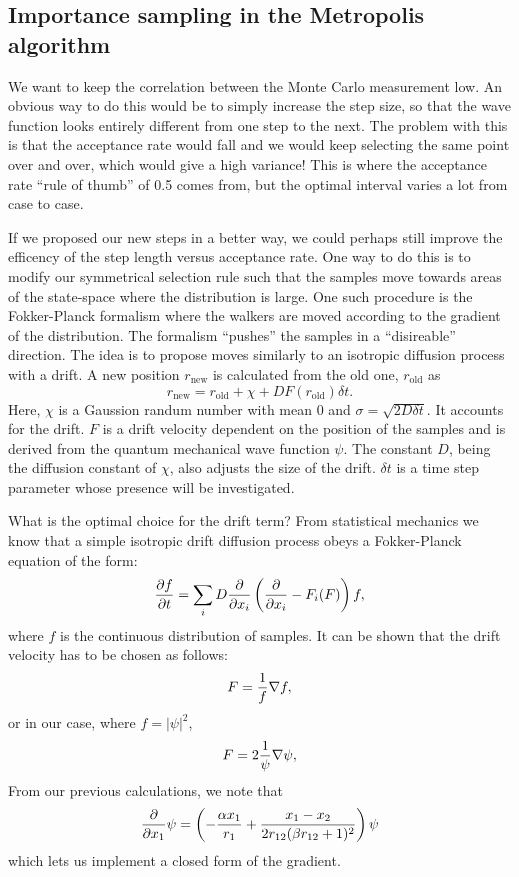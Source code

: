 \documentclass[aps,prc,twocolumn,floatfix]{revtex4}
\begin{document}
\subsection{Importance sampling in the Metropolis algorithm}
 We want to keep the correlation between the Monte Carlo measurement low. An obvious way to do this would be to simply increase the step size, so that the wave function looks entirely different from one step to the next. The problem with this is that the acceptance rate would fall and we would keep selecting the same point over and over, which would give a high variance! This is where the acceptance rate ``rule of thumb'' of 0.5 comes from, but the optimal interval varies a lot from case to case.
 
 If we proposed our new steps in a better way, we could perhaps still improve the efficency of the step length versus acceptance rate. One way to do this is to modify our symmetrical selection rule such that the samples move towards areas of the state-space where the distribution is large. One such procedure is the Fokker-Planck formalism where the walkers are moved according to the gradient of the distribution. The formalism ``pushes'' the samples in a ``disireable'' direction. The idea is to propose moves similarly to an isotropic diffusion process with a drift. A new position $r_\text{new}$ is calculated from the old one, $r_\text{old}$ as
 \begin{equation}
  r_\text{new} = r_\text{old} + \chi + DF(r_\text{old}) \delta t.
 \end{equation}
Here, $\chi$ is a Gaussion randum number with mean 0 and $\sigma = \sqrt{2D\delta t}$. It accounts for the drift. $F$ is a drift velocity dependent on the position of the samples and is derived from the quantum mechanical wave function $\psi$. The constant $D$, being the diffusion constant of $\chi$, also adjusts the size of the drift. $\delta t$ is a time step parameter whose presence will be investigated. 

What is the optimal choice for the drift term? From statistical mechanics we know that a simple isotropic drift diffusion process obeys a Fokker-Planck equation of the form:
\begin{equation}
 {\partial f \over \partial t} = \sum_i D {\partial \over \partial x_i} \left( {\partial \over \partial x_i} - F_i(F)\right) f,
\end{equation}
where $f$ is the continuous distribution of samples. It can be shown that the drift velocity has to be chosen as follows: 
\begin{equation}
 F = {1 \over f} \nabla f,
\end{equation}
or in our case, where $f = |\psi|^2$, 
\begin{equation}
 F = 2{1\over \psi}\nabla \psi, 
\end{equation}
From our previous calculations, we note that 
\begin{equation}
 {\partial \over \partial x_1}\psi = \left( - {\alpha x_1 \over r_1} + {x_1-x_2 \over 2r_{12}(\beta r_{12} + 1)^2} \right) \psi
\end{equation}
which lets us implement a closed form of the gradient.
\end{document}
